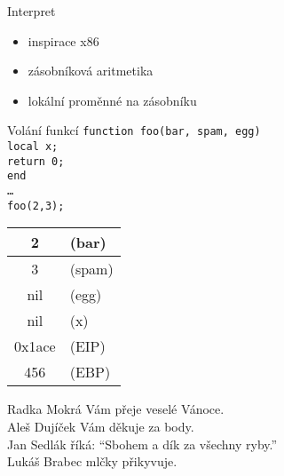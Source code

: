 \documentclass{beamer}
\begin{document}
\begin{frame}{Interpret}
  \begin{itemize}
  \item inspirace x86
  \item zásobníková aritmetika
  \item lokální proměnné na zásobníku
  \end{itemize}
\end{frame}

\begin{frame}{Volání funkcí}
  \tt{function foo(bar, spam, egg)\\\hspace{2em} local x;\\\hspace{2em} return 0;\\end}\\
  \ldots\\
  \tt{foo(2,3);}\\
  \begin{center}
  \begin{tabular}{|c l|}
    \hline
    2 & (bar)\\\hline
    3 & (spam)\\\hline
    nil & (egg)\\\hline
    nil & (x)\\\hline
    0x1ace & (EIP)\\\hline
    456 & (EBP)\\\hline
  \end{tabular}
  \end{center}
\end{frame}

\begin{frame}{}
  Radka Mokrá Vám přeje veselé Vánoce.\\
  Aleš Dujíček Vám děkuje za body.\\
  Jan Sedlák říká: ``Sbohem a dík za všechny ryby.''\\
  Lukáš Brabec mlčky přikyvuje.
\end{frame}
\end{document}
